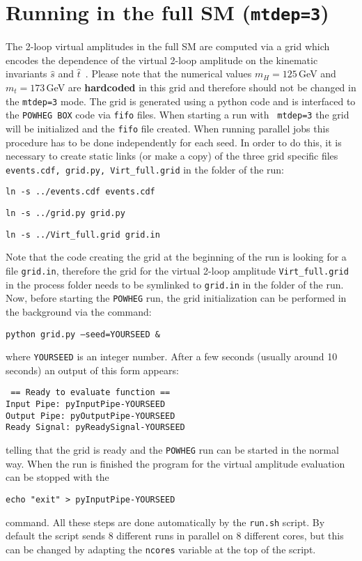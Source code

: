 \documentclass[paper]{JHEP3}
\newcommand\POWHEG{{\tt POWHEG}}
\newcommand\POWHEGBOX{{\tt POWHEG BOX}}
\begin{document}
\section{Running in the full SM ({\tt mtdep=3})}
The 2-loop virtual amplitudes in the full SM are computed via a grid
which encodes the dependence of the virtual 2-loop amplitude on the
kinematic invariants $\hat{s}$ and
$\hat{t}$~\cite{Heinrich:2017kxx}. Please note that the numerical
values $m_H=125$\,GeV and $m_t=173$\,GeV are {\bf hardcoded} in this
grid and therefore should not be changed in the {\tt mtdep=3} mode.
The grid is generated using a python code and is interfaced to the
\POWHEGBOX{} code via {\tt fifo} files. When starting a run with {\tt
  mtdep=3} the grid will be initialized and the {\tt fifo} file
created. When running parallel jobs this procedure has to be done
independently for each seed. In order to do this, it is necessary to
create static links (or make a copy) of the three grid specific files
{\tt events.cdf, grid.py, Virt\_full.grid} in the folder of the run:
\begin{description}
\item{\tt ln -s ../events.cdf events.cdf}
\item{\tt ln -s ../grid.py grid.py}
\item{\tt ln -s ../Virt\_full.grid grid.in}
\end{description}
Note that the code creating the grid at the beginning of the run is
looking for a file {\tt grid.in}, therefore the grid for the virtual
2-loop amplitude {\tt Virt\_full.grid} in the process folder needs to
be symlinked to {\tt grid.in} in the folder of the run. Now, before
starting the \POWHEG{}  run, the grid initialization can be performed in
the background via the command:
\begin{description}
\item{\tt python grid.py --seed=YOURSEED \&}
\end{description}
where {\tt YOURSEED} is an integer number. After a few seconds
(usually around 10 seconds) an output of this form appears:
\begin{center}
  {\tt
    == Ready to evaluate function ==\\
    Input Pipe:  pyInputPipe-YOURSEED\\
    Output Pipe:  pyOutputPipe-YOURSEED\\
    Ready Signal:  pyReadySignal-YOURSEED\\
  }
\end{center}
telling that the grid is ready and the \POWHEG{} run can be started in
the normal way. When the run is finished the program for the virtual
amplitude evaluation can be stopped with the
\begin{center}
  {\tt echo "exit" > pyInputPipe-YOURSEED}
\end{center}
command. All these steps are done automatically by the {\tt run.sh}
script. By default the script sends 8 different runs in parallel on 8
different cores, but this can be changed by adapting the {\tt ncores}
variable at the top of the script.
\end{document}
